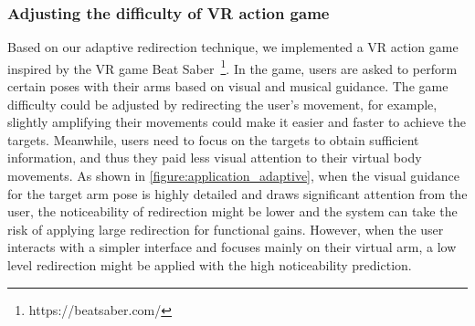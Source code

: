 \subsubsection{Adjusting the difficulty of VR action game}
Based on our adaptive redirection technique, we implemented a VR action game inspired by the VR game Beat Saber~\footnote{https://beatsaber.com/}.
In the game, users are asked to perform certain poses with their arms based on visual and musical guidance.
The game difficulty could be adjusted by redirecting the user's movement, for example, slightly amplifying their movements could make it easier and faster to achieve the targets.
Meanwhile, users need to focus on the targets to obtain sufficient information, and thus they paid less visual attention to their virtual body movements.
As shown in \autoref{figure:application_adaptive}, when the visual guidance for the target arm pose is highly detailed and draws significant attention from the user, 
the noticeability of redirection might be lower and 
the system can take the risk of applying large redirection for functional gains.
However, when the user interacts with a simpler interface and focuses mainly on their virtual arm, 
a low level redirection might be applied with the high noticeability prediction.



